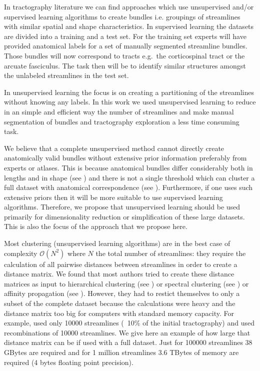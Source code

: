 \documentclass{bioinfo}
\begin{document}

In tractography literature we can find approaches which use unsupervised
and/or supervised learning algorithms to create bundles i.e. groupings
of streamlines with similar spatial and shape characteristics. In
supervised learning the datasets are divided into a training and a test
set. For the training set experts will have provided anatomical
labels for a set of manually segmented streamline bundles. Those bundles
will now correspond to tracts e.g.~the corticospinal tract or the
arcuate fasciculus. The task then will be to identify similar
structures amongst the unlabeled streamlines in the test set.

In unsupervised learning the focus is on creating a partitioning of the
streamlines without knowing any labels. In this work we used
unsupervised learning to reduce in an simple and efficient way the
number of streamlines and make manual segmentation of bundles and
tractography exploration a less time consuming task.

We believe that a complete unsupervised method cannot directly create
anatomically valid bundles without extensive prior information
preferably from experts or atlases. This is because anatomical bundles
differ considerably both in lengths and in shape (see
\citet{schmahmann2009fiber}) and there is not a single threshold which
can cluster a full dataset with anatomical correspondence (see
\citet{Guevara2010}). Furthermore, if one uses such extensive priors
then it will be more suitable to use supervised learning
algorithms. Therefore, we propose that unsupervised learning should be
used primarily for dimensionality reduction or simplification of these
large datasets. This is also the focus of the approach that we propose
here.

Most clustering (unsupervised learning algorithms) are in the best case
of complexity $\mathcal{O}(N^2)$ where $N$ the total number of
streamlines: they require the calculation of all pairwise distances
between streamlines in order to create a distance matrix. We found that
most authors tried to create these distance matrices as input to
hierarchical clustering (see \citet{ moberts2005evaluation,
  zhang2005dti, Tsai2007, zhang2008identifying, jianu2009exploring,
  Visser2010, Guevara2010, Guevara12}) or spectral clustering (see
\citet{ODonnell_IEEETMI07, o2009tract, jonasson2005fiber,
  ziyan2009consistency}) or affinity propagation (see
\citet{leemans17new, malcolm2009filtered}). However, they had to restict
themselves to only a subset of the complete dataset because the
calculations were heavy and the distance matrix too big for computers
with standard memory capacity. For example, \citet{ODonnell_IEEETMI07}
used only \num{10000} streamlines (~10\% of the initial tractography)
and \citet{Visser2010} used recombinations of \num{10000} streamlines.
We give here an example of how large that distance matrix can be if used
with a full dataset. Just for \num{100000} streamlines 38 GBytes are
required and for 1 million streamlines 3.6 TBytes of memory are required
(4 bytes floating point precision).
\end{document}

